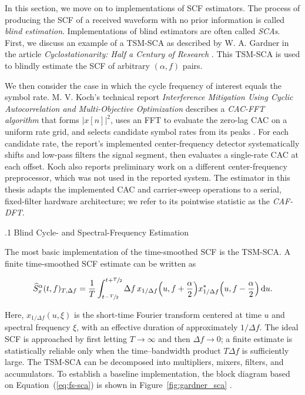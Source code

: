 In this section, we move on to implementations of SCF estimators.  The process of producing the SCF of a received waveform with no prior information is called \textit{blind estimation}.  Implementations of blind estimators are often called \textit{SCAs}.  First, we discuss an example of a TSM-SCA as described by W. A. Gardner in the article \textit{Cyclostationarity: Half a Century of Research} \cite{gardner-06}.  This TSM-SCA is used to blindly estimate the SCF of arbitrary $(\alpha,f)$ pairs.

We then consider the case in which the cycle frequency of interest equals the symbol rate.  M. V. Koch's technical report \textit{Interference Mitigation Using Cyclic Autocorrelation and Multi-Objective Optimization} describes a \textit{CAC-FFT algorithm} that forms $|x[n]|^2$, uses an FFT to evaluate the zero-lag CAC on a uniform rate grid, and selects candidate symbol rates from its peaks \cite{koch-19}.  For each candidate rate, the report's implemented center-frequency detector systematically shifts and low-pass filters the signal segment, then evaluates a single-rate CAC at each offset.  Koch also reports preliminary work on a different center-frequency preprocessor, which was not used in the reported system.  The estimator in this thesis adapts the implemented CAC and carrier-sweep operations to a serial, fixed-filter hardware architecture; we refer to its pointwise statistic as the \textit{CAF-DFT}.

%
%
\bigskip
{}
.1 \quad Blind Cycle- and Spectral-Frequency Estimation

The most basic implementation of the time-smoothed SCF is the TSM-SCA.  A finite time-smoothed SCF estimate can be written as

\begin{equation}\label{eq:fs-sca}
\widehat{S}_{x}^{\alpha}(t,f)_{T,\Delta f} = \frac{1}{T} \int_{t-\sfrac{T}{2}}^{t+\sfrac{T}{2}} \Delta f\,x_{1/\Delta f}\Big(u,f+\frac{\alpha}{2}\Big)x^{*}_{1/\Delta f}\Big(u,f-\frac{\alpha}{2}\Big)\,\mathrm{d}u.
\end{equation}

Here, $x_{1/\Delta f}(u,\xi)$ is the short-time Fourier transform centered at time $u$ and spectral frequency $\xi$, with an effective duration of approximately $1/\Delta f$.  The ideal SCF is approached by first letting $T\to\infty$ and then $\Delta f\to0$; a finite estimate is statistically reliable only when the time--bandwidth product $T\Delta f$ is sufficiently large.  The TSM-SCA can be decomposed into multipliers, mixers, filters, and accumulators.  To establish a baseline implementation, the block diagram based on Equation~(\ref{eq:fs-sca}) is shown in Figure~\ref{fig:gardner_sca} \cite{gardner-06}.


